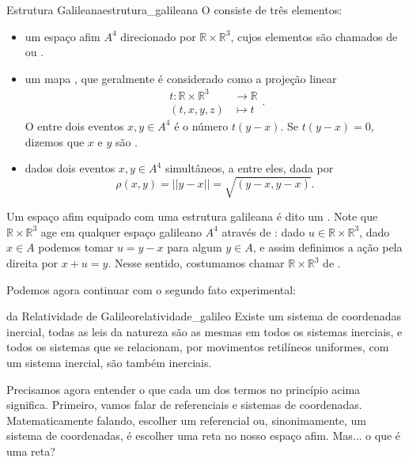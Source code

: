 \documentclass[a4paper,12pt]{book}
\begin{document}
\begin{defi}{Estrutura Galileana}{estrutura_galileana}
  O  consiste de três elementos:
  \begin{itemize}
    \item um espaço afim $A^4$ direcionado por $\mathbb{R} \times \mathbb{R}^3$, cujos elementos são chamados de  ou .
    
    \item um mapa , que geralmente é considerado como a projeção linear \begin{equation}
      \begin{split}
        t \colon \mathbb{R} \times \mathbb{R}^3 &\to \mathbb{R} \\ (t,x,y,z) &\mapsto t
      \end{split}.
    \end{equation} O  entre dois eventos $x, y \in A^4$ é o número $t(y - x)$. Se $t(y - x) = 0$, dizemos que $x$ e $y$ são .

    \item dados dois eventos $x, y \in A^4$ simultâneos, a  entre eles, dada por $$\rho(x,y) = ||y - x|| = \sqrt{(y - x, y - x)}.$$
  \end{itemize}

  Um espaço afim equipado com uma estrutura galileana é dito um . Note que $\mathbb{R} \times \mathbb{R}^3$ age em qualquer espaço galileano $A^4$ através de : dado $u \in \mathbb{R} \times \mathbb{R}^3$, dado $x \in A$ podemos tomar $u = y - x$ para algum $y \in A$, e assim definimos a ação pela direita por $x + u = y$. Nesse sentido, costumamos chamar $\mathbb{R} \times \mathbb{R}^3$ de .
\end{defi}

Podemos agora continuar com o segundo fato experimental:

\begin{ax}{da Relatividade de Galileo}{relatividade_galileo}
  Existe um sistema de coordenadas inercial, todas as leis da natureza são as mesmas em todos os sistemas inerciais, e todos os sistemas que se relacionam, por movimentos retilíneos uniformes, com um sistema inercial, são também inerciais.
\end{ax}

Precisamos agora entender o que cada um dos termos no princípio acima significa. Primeiro, vamos falar de referenciais e sistemas de coordenadas. Matematicamente falando, escolher um referencial ou, sinonimamente, um sistema de coordenadas, é escolher uma reta no nosso espaço afim. Mas... o que é uma reta?
\end{document}
